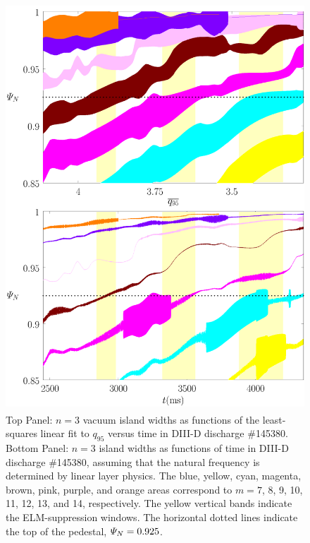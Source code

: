 \documentclass[12pt,prb,aps]{revtex4-1}
\begin{document}
\begin{figure}
\includegraphics[height=6in]{fig12.pdf}
\caption{Top Panel: $n=3$ vacuum island widths as functions of the least-squares linear fit to $q_{95}$ versus time
in   DIII-D discharge \#145380.
Bottom Panel:  $n=3$ island widths as functions of time
in   DIII-D discharge \#145380, assuming that the natural frequency is determined by linear layer physics. The blue, yellow, cyan, magenta, brown, pink,
purple, and orange  areas correspond to $m=7$, 8, 9, 10, 11, 12, 13, and 14, respectively. The yellow vertical bands indicate the ELM-suppression windows. 
The horizontal dotted lines indicate the top of the pedestal, ${\mit\Psi}_N=0.925$.} \label{fig12}
\end{figure}
\end{document}

